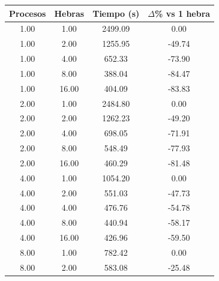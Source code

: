 \begin{table}[ht]
    \centering
    \begin{tabular}{|c|c|c|c|}
        \hline
        \textbf{Procesos} & \textbf{Hebras} & \textbf{Tiempo (s)} & \textbf{$\Delta$\% vs 1 hebra} \\
        \hline
        1.00              & 1.00            & 2499.09             & 0.00                           \\
        1.00              & 2.00            & 1255.95             & -49.74                         \\
        1.00              & 4.00            & 652.33              & -73.90                         \\
        1.00              & 8.00            & 388.04              & -84.47                         \\
        1.00              & 16.00           & 404.09              & -83.83                         \\
        2.00              & 1.00            & 2484.80             & 0.00                           \\
        2.00              & 2.00            & 1262.23             & -49.20                         \\
        2.00              & 4.00            & 698.05              & -71.91                         \\
        2.00              & 8.00            & 548.49              & -77.93                         \\
        2.00              & 16.00           & 460.29              & -81.48                         \\
        4.00              & 1.00            & 1054.20             & 0.00                           \\
        4.00              & 2.00            & 551.03              & -47.73                         \\
        4.00              & 4.00            & 476.76              & -54.78                         \\
        4.00              & 8.00            & 440.94              & -58.17                         \\
        4.00              & 16.00           & 426.96              & -59.50                         \\
        8.00              & 1.00            & 782.42              & 0.00                           \\
        8.00              & 2.00            & 583.08              & -25.48                         \\

\end{tabular}
\end{table}
